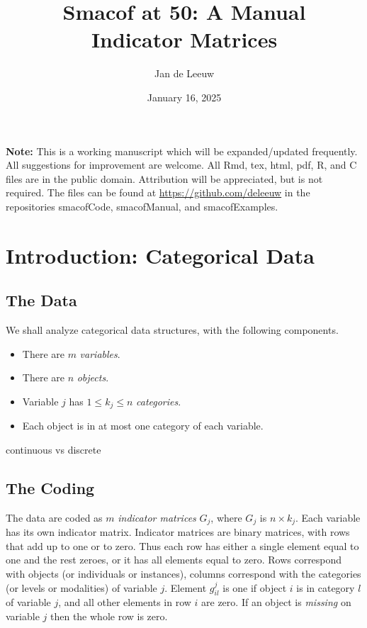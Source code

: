 \documentclass[
  12pt,
  letterpaper,
  DIV=11,
  numbers=noendperiod]{scrartcl}
\title{Smacof at 50: A Manual\\
Indicator Matrices}
\author{Jan de Leeuw}
\date{January 16, 2025}
\providecommand{\tightlist}{%
  \setlength{\itemsep}{0pt}\setlength{\parskip}{0pt}}\usepackage{longtable,booktabs,array}
\renewcommand*\contentsname{Table of contents}
\newcommand\contentsname{Table of contents}
\begin{document}
\maketitle

\renewcommand*\contentsname{Table of contents}
{
\hypersetup{linkcolor=}
\setcounter{tocdepth}{3}
\tableofcontents
}

\textbf{Note:} This is a working manuscript which will be
expanded/updated frequently. All suggestions for improvement are
welcome. All Rmd, tex, html, pdf, R, and C files are in the public
domain. Attribution will be appreciated, but is not required. The files
can be found at \url{https://github.com/deleeuw} in the repositories
smacofCode, smacofManual, and smacofExamples.

\section{Introduction: Categorical Data}\label{cat}

\subsection{The Data}\label{the-data}

We shall analyze categorical data structures, with the following
components.

\begin{itemize}
\tightlist
\item
  There are \(m\) \emph{variables}.
\item
  There are \(n\) \emph{objects}.
\item
  Variable \(j\) has \(1\leq k_j\leq n\) \emph{categories}.
\item
  Each object is in at most one category of each variable.
\end{itemize}

continuous vs discrete

\subsection{The Coding}\label{the-coding}

The data are coded as \(m\) \emph{indicator matrices} \(G_j\), where
\(G_j\) is \(n\times k_j\). Each variable has its own indicator matrix.
Indicator matrices are binary matrices, with rows that add up to one or
to zero. Thus each row has either a single element equal to one and the
rest zeroes, or it has all elements equal to zero. Rows correspond with
objects (or individuals or instances), columns correspond with the
categories (or levels or modalities) of variable \(j\). Element
\(g_{il}^j\) is one if object \(i\) is in category \(l\) of variable
\(j\), and all other elements in row \(i\) are zero. If an object is
\emph{missing} on variable \(j\) then the whole row is zero.
\end{document}
